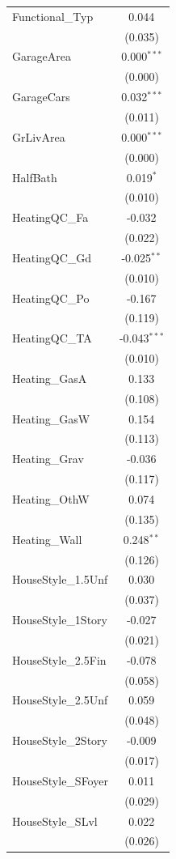\begin{table}[!htbp]
\begin{tabular}{@{\extracolsep{5pt}}lc}
 Functional\_Typ & 0.044$^{}$ \\
& (0.035) \\
 GarageArea & 0.000$^{***}$ \\
& (0.000) \\
 GarageCars & 0.032$^{***}$ \\
& (0.011) \\
 GrLivArea & 0.000$^{***}$ \\
& (0.000) \\
 HalfBath & 0.019$^{*}$ \\
& (0.010) \\
 HeatingQC\_Fa & -0.032$^{}$ \\
& (0.022) \\
 HeatingQC\_Gd & -0.025$^{**}$ \\
& (0.010) \\
 HeatingQC\_Po & -0.167$^{}$ \\
& (0.119) \\
 HeatingQC\_TA & -0.043$^{***}$ \\
& (0.010) \\
 Heating\_GasA & 0.133$^{}$ \\
& (0.108) \\
 Heating\_GasW & 0.154$^{}$ \\
& (0.113) \\
 Heating\_Grav & -0.036$^{}$ \\
& (0.117) \\
 Heating\_OthW & 0.074$^{}$ \\
& (0.135) \\
 Heating\_Wall & 0.248$^{**}$ \\
& (0.126) \\
 HouseStyle\_1.5Unf & 0.030$^{}$ \\
& (0.037) \\
 HouseStyle\_1Story & -0.027$^{}$ \\
& (0.021) \\
 HouseStyle\_2.5Fin & -0.078$^{}$ \\
& (0.058) \\
 HouseStyle\_2.5Unf & 0.059$^{}$ \\
& (0.048) \\
 HouseStyle\_2Story & -0.009$^{}$ \\
& (0.017) \\
 HouseStyle\_SFoyer & 0.011$^{}$ \\
& (0.029) \\
 HouseStyle\_SLvl & 0.022$^{}$ \\
& (0.026) \\

\end{tabular}
\end{table}
